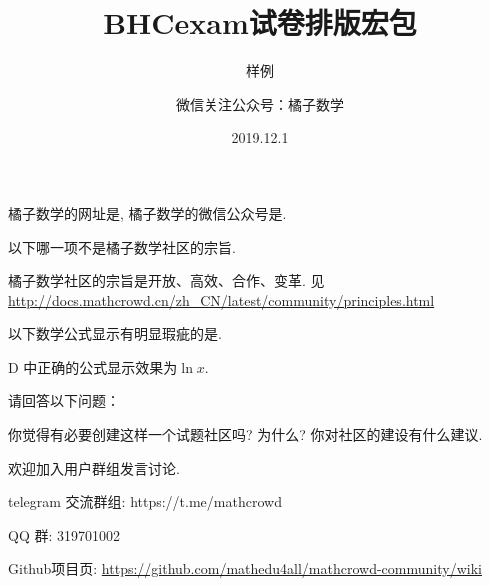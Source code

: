 \documentclass[answers]{BHCexam}
\begin{document}
\title{BHCexam试卷排版宏包}

\subtitle{样例}


\author{微信关注公众号：橘子数学}

\date{2019.12.1}

\maketitle

\begin{groups}

\begin{questions}[s]

\question[30] 橘子数学的网址是, 橘子数学的微信公众号是.

\end{questions}

\begin{questions}[ps]

\question[30] 以下哪一项不是橘子数学社区的宗旨.

\begin{solution}{4cm}
\method 橘子数学社区的宗旨是开放、高效、合作、变革.
\method 见 \url{http://docs.mathcrowd.cn/zh_CN/latest/community/principles.html}
\end{solution}

\question[40] 以下数学公式显示有明显瑕疵的是.

\begin{solution}{4cm}
\methodonly D 中正确的公式显示效果为$\ln{x}$.
\end{solution}
\end{questions}

\begin{questions}[st]
\question[30] 请回答以下问题：
\begin{subquestions}
    \subquestion 你觉得有必要创建这样一个试题社区吗? 为什么?
    \subquestion 你对社区的建设有什么建议.
\end{subquestions}

\begin{solution}{4cm}
	\methodonly 欢迎加入用户群组发言讨论. 
	
telegram 交流群组: https://t.me/mathcrowd

QQ 群: 319701002

Github项目页: \url{https://github.com/mathedu4all/mathcrowd-community/wiki}

	
\end{solution}
\end{questions}

\end{groups}
\end{document}
